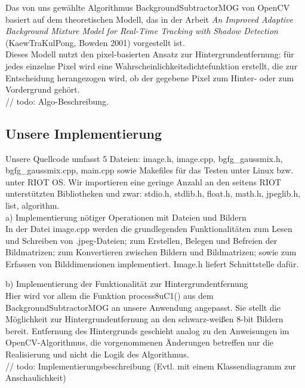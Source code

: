 \documentclass[10pt,a4paper]{article}
\begin{document}
Das von uns gewählte Algorithmus BackgroundSubtractorMOG von OpenCV basiert auf dem theoretischen Modell, das in der Arbeit {\it An Improved Adaptive Background Mixture Model for Real-Time Tracking with Shadow Detection} (KaewTraKulPong, Bowden 2001) vorgestellt ist. \\

Dieses Modell nutzt den pixel-basierten Ansatz zur Hintergrundentfernung: für jedes einzelne Pixel wird eine Wahrscheinlichkeitsdichtefunktion erstellt, die zur Entscheidung herangezogen wird, ob der gegebene Pixel zum Hinter- oder zum Vordergrund gehört. \\

// todo: Algo-Beschreibung. 

\subsection{Unsere Implementierung}

Unsere Quellcode umfasst 5 Dateien: image.h, image.cpp, bgfg\_gaussmix.h, bgfg\_gaussmix.cpp, main.cpp sowie Makefiles für das Testen unter Linux bzw. unter RIOT OS. Wir importieren eine geringe Anzahl an den seitens RIOT unterstützten Bibliotheken und zwar: stdio.h, stdlib.h, float.h, math.h, jpeglib.h, list, algorithm. \\

a) Implementierung nötiger Operationen mit Dateien und Bildern \\

In der Datei image.cpp werden die grundlegenden Funktionalitäten zum Lesen und Schreiben von .jpeg-Dateien; zum Erstellen, Belegen und Befreien der Bildmatrizen; zum Konvertieren zwischen Bildern und Bildmatrizen; sowie zum Erfassen von Bilddimensionen implementiert. Image.h liefert Schnittstelle dafür.

b) Implementierung der Funktionalität zur Hintergrundentfernung \\

Hier wird vor allem die Funktion process8uC1() aus dem BackgroundSubtractorMOG an unsere Anwendung angepasst. Sie stellt die Möglichkeit zur Hintergrundentfernung an den schwarz-weißen 8-bit Bildern bereit. Entfernung des Hintergrunds geschieht analog zu den Anweisungen im OpenCV-Algorithmus, die vorgenommenen Änderungen betreffen nur die Realisierung und nicht die Logik des Algorithmus. \\

// todo: Implementierungsbeschreibung (Evtl. mit einem Klassendiagramm zur Anschaulichkeit)
\end{document}
